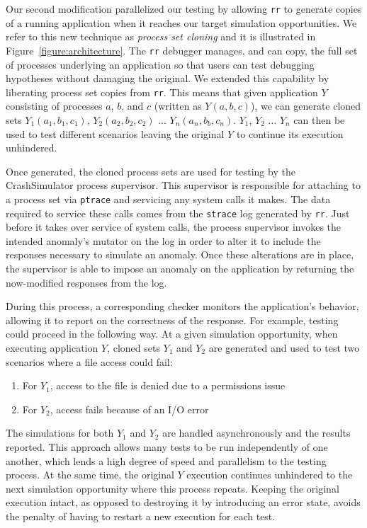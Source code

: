 Our second modification parallelized our testing
by allowing {\tt rr} to generate copies of a running application when
it reaches our target simulation opportunities.
We refer to this new technique as {\it process set cloning}
and it is illustrated
in Figure~\ref{figure:architecture}.
The {\tt rr}
debugger manages, and can copy, the full set of processes underlying an
application so that users can test debugging hypotheses without damaging
the original.  We extended this capability by liberating process
set copies from {\tt rr}.  This means that given application $Y$ consisting
of processes $a$, $b$, and $c$ (written as $Y(a, b, c)$), we can generate
cloned sets $Y_1(a_1, b_1, c_1)$, $Y_2(a_2, b_2, c_2)$ ... $Y_n(a_n, b_b,
c_n)$.  $Y_1$, $Y_2$ ... $Y_n$ can then be used to test different scenarios
leaving the original $Y$ to continue its execution unhindered.

Once generated, the cloned process sets are used
for testing by the CrashSimulator process supervisor.
This supervisor is responsible for attaching to a process set
via {\tt ptrace} and
servicing any system calls it makes.
The data required to service these calls
comes from the  {\tt strace} log
generated by {\tt rr}.
Just before it takes over service of system calls,
the process supervisor invokes the intended anomaly's mutator
on the log in order to alter it to include the responses
necessary to simulate an anomaly.
Once these alterations are in place,
the supervisor is able to impose an anomaly
on the application by returning the now-modified responses from the log.

During this process,
a corresponding checker
monitors the application's behavior,
allowing it to report on the correctness of the response.
For example, testing could proceed in the following way.
At a given simulation opportunity, when executing application $Y$,
cloned sets $Y_1$ and $Y_2$ are generated and
used to test two scenarios where a file access could fail:
\begin{enumerate}
    \item{For $Y_1$, access to the file is denied due to a permissions issue}
    \item{For $Y_2$, access fails because of an I/O error}
\end{enumerate}
The simulations for both $Y_1$ and $Y_2$ are handled asynchronously and
the results reported.
This approach allows many tests to be run independently of one another,
which lends a
high degree of speed and
parallelism to the testing process.
At the same time, the original $Y$ execution continues unhindered to the
next simulation opportunity where this process repeats.
Keeping the original execution intact,
as opposed to destroying it by introducing an error state,
avoids the penalty
of having to restart a new execution for each test.

